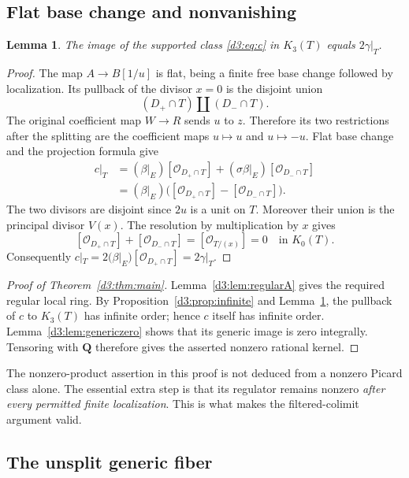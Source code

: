 \documentclass[11pt,a4paper]{amsart}
\numberwithin{equation}{section}
\newtheorem{lemma}[theorem]{Lemma}
\theoremstyle{definition}
\theoremstyle{remark}
\newcommand{\Q}{\mathbf Q}
\newcommand{\OO}{\mathcal O}
\begin{document}
\subsection{Flat base change and nonvanishing}

\begin{lemma}\label{d3:lem:basechange}
The image of the supported class \eqref{d3:eq:c} in $K_3(T)$ equals $2\gamma|_T$.
\end{lemma}
\begin{proof}
The map $A\to B[1/u]$ is flat, being a finite free base change followed by localization. Its pullback of the divisor $x=0$ is the disjoint union
\[
(D_+\cap T)\amalg(D_-\cap T).
\]
The original coefficient map $W\to R$ sends $u$ to $z$. Therefore its two restrictions after the splitting are the coefficient maps $u\mapsto u$ and $u\mapsto -u$. Flat base change and the projection formula give
\begin{align*}
c|_T
&=(\beta|_E)[\OO_{D_+\cap T}]+(\sigma\beta|_E)[\OO_{D_-\cap T}]\\
&=(\beta|_E)\bigl([\OO_{D_+\cap T}]-[\OO_{D_-\cap T}]\bigr).
\end{align*}
The two divisors are disjoint since $2u$ is a unit on $T$. Moreover their union is the principal divisor $V(x)$. The resolution by multiplication by $x$ gives
\[
[\OO_{D_+\cap T}]+[\OO_{D_-\cap T}]
=[\OO_{T/(x)}]=0\quad\text{in }K_0(T).
\]
Consequently $c|_T=2(\beta|_E)[\OO_{D_+\cap T}]=2\gamma|_T$.
\end{proof}

\begin{proof}[Proof of Theorem~\ref{d3:thm:main}]
Lemma~\ref{d3:lem:regularA} gives the required regular local ring. By Proposition~\ref{d3:prop:infinite} and Lemma~\ref{d3:lem:basechange}, the pullback of $c$ to $K_3(T)$ has infinite order; hence $c$ itself has infinite order. Lemma~\ref{d3:lem:genericzero} shows that its generic image is zero integrally. Tensoring with $\Q$ therefore gives the asserted nonzero rational kernel.
\end{proof}

The nonzero-product assertion in this proof is not deduced from a nonzero Picard class alone. The essential extra step is that its regulator remains nonzero \emph{after every permitted finite localization}. This is what makes the filtered-colimit argument valid.

\subsection{The unsplit generic fiber}
\end{document}
